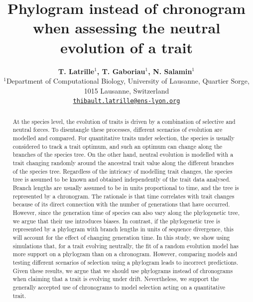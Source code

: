 \documentclass{article}
\title{Phylogram instead of chronogram when assessing the neutral evolution of a trait}
\author{
\large
\textbf{T. {Latrille}$^{1}$, T. {Gaboriau}$^{1}$, N. {Salamin}$^{1}$}\\
\normalsize
$^{1}$Department of Computational Biology, University of Lausanne, Quartier Sorge, 1015 Lausanne, Switzerland\\
\texttt{\href{mailto:thibault.latrille@ens-lyon.org}{thibault.latrille@ens-lyon.org}} \\
}
\begin{document}
\maketitle

\begin{abstract}
At the species level, the evolution of traits is driven by a combination of selective and neutral forces. To disentangle these processes, different scenarios of evolution are modelled and compared. For quantitative traits under selection, the species is usually considered to track a trait optimum, and such an optimum can change along the branches of the species tree. On the other hand, neutral evolution is modelled with a trait changing randomly around the ancestral trait value along the different branches of the species tree. Regardless of the intricacy of modelling trait changes, the species tree is assumed to be known and obtained independently of the trait data analysed. Branch lengths are usually assumed to be in units proportional to time, and the tree is represented by a chronogram. The rationale is that time correlates with trait changes because of its direct connection with the number of generations that have occurred. However, since the generation time of species can also vary along the phylogenetic tree, we argue that their use introduces biases. In contrast, if the phylogenetic tree is represented by a phylogram with branch lengths in units of sequence divergence, this will account for the effect of changing generation time. In this study, we show using simulations that, for a trait evolving neutrally, the fit of a random evolution model has more support on a phylogram than on a chronogram. However, comparing models and testing different scenarios of selection using a phylogram leads to incorrect predictions. Given these results, we argue that we should use phylograms instead of chronograms when claiming that a trait is evolving under drift. Nevertheless, we support the generally accepted use of chronograms to model selection acting on a quantitative trait.
\end{abstract}


\newpage
\end{document}
